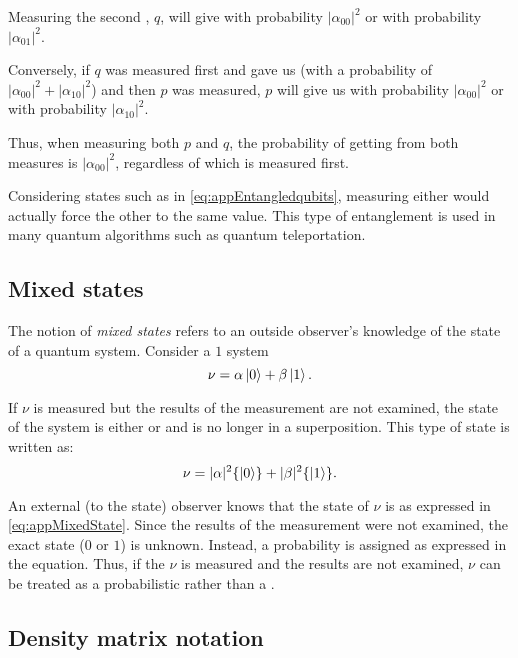 Measuring the second \qubit{}, $q$, will give  with probability $|\alpha_{00}|^2$ or 
with probability $|\alpha_{01}|^2$.

Conversely, if $q$ was measured first and gave us  (with a probability of $|\alpha_{00}|^2 +
|\alpha_{10}|^2$) and then $p$ was measured, $p$ will give us  with probability
$|\alpha_{00}|^2$ or  with probability $|\alpha_{10}|^2$.

Thus, when measuring both $p$ and $q$, the probability of getting  from both measures is
$|\alpha_{00}|^2$, regardless of which \qubit{} is measured first.

Considering states such as in \ref{eq:appEntangledqubits}, measuring either \qubit{} would actually
force the other \qubit{} to the same value. This type of entanglement is used in many quantum
algorithms such as quantum teleportation.

\subsection{Mixed states} %
\label{sub:mixed_states}

The notion of \emph{mixed states} refers to an outside observer's knowledge of the state of a
quantum system. Consider a $1$ \qubit{} system
\begin{equation}
  \nu = \alpha\left\vert{0}\right\rangle + \beta\left\vert{1}\right\rangle.\label{eq:appOnequbitSystem}
\end{equation}

If $\nu$ is measured but the results of the measurement are not examined, the state of the system
is either  or  and is no longer in a superposition. This type of state is written as:
\begin{equation}
  \nu = |\alpha|^2\{\left\vert{0}\right\rangle\} + |\beta|^2\{\left\vert{1}\right\rangle\}.\label{eq:appMixedState}
\end{equation}

An external (to the state) observer knows that the state of $\nu$ is as expressed in
\vref{eq:appMixedState}. Since the results of the measurement were not examined, the exact state
($0$ or $1$) is unknown. Instead, a probability is assigned as expressed in the equation. Thus, if
the \qubit{} $\nu$ is measured and the results are not examined, $\nu$ can be treated as a
probabilistic \bit{} rather than a \qubit.


\subsection{Density matrix notation} %
\label{sub:density_matrix_notation}

